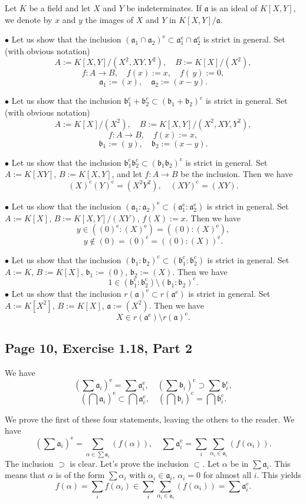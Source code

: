 \documentclass[parskip=half,fontsize=12pt]{scrartcl}%
\newcommand{\oo}{\operatorname}\newcommand{\ooo}{\operatorname*}
\newcommand{\mf}{\mathfrak}
\newcommand{\bu}{\bullet}
\begin{document}
Let $K$ be a field and let $X$ and $Y$ be indeterminates. If $\mf a$ is an ideal of $K[X,Y]$, we denote by $x$ and $y$ the images of $X$ and $Y$ in $K[X,Y]/\mf a$.

$\bu$ Let us show that the inclusion $(\mf a_1\cap\mf a_2)^{\oo e}\subset\mf a_1^{\oo e}\cap\mf a_2^{\oo e}$ is strict in general. Set (with obvious notation) 
$$
A:=K[X,Y]/(X^2,XY,Y^2),\quad B:=K[X]/(X^2),
$$ 
$$
f:A\to B,\quad f(x):=x,\quad f(\,y):=0,
$$ 
$$
\mf a_1:=(x),\quad\mf a_2:=(x-y).
$$

$\bu$ Let us show that the inclusion $\mf b_1^{\oo c}+\mf b_2^{\oo c}\subset(\mf b_1+\mf b_2)^{\oo c}$ is strict in general. Set (with obvious notation) 
$$
A:=K[X]/(X^2),\quad B:=K[X,Y]/(X^2,XY,Y^2),
$$ 
$$
f:A\to B,\quad f(x):=x,
$$ 
$$
\mf b_1:=(\,y),\quad\mf b_2:=(x-y).
$$

$\bu$ Let us show that the inclusion $\mf b_1^{\oo c}\mf b_2^{\oo c}\subset(\mf b_1\mf b_2)^{\oo c}$ is strict in general. Set $A:=K[XY]$, $B:=K[X,Y]$, and let $f:A\to B$ be the inclusion. Then we have 
$$
(X)^{\oo c}(Y)^{\oo c}=(X^2Y^2),\quad(XY)^{\oo c}=(XY).
$$

$\bu$ Let us show that the inclusion $(\mf a_1:\mf a_2)^{\oo e}\subset(\mf a_1^{\oo e}:\mf a_2^{\oo e})$ is strict in general. Set $A:=K[X]$, $B:=K[X,Y]/(XY)$, $f(X):=x$. Then we have 
$$
y\in((0)^{\oo e}:(X)^{\oo e})=((0):(X)^{\oo e}),
$$ 
$$y\notin(0)=(0)^{\oo e}=((0):(X))^{\oo e}.$$

$\bu$ Let us show that the inclusion $(\mf b_1:\mf b_2)^{\oo c}\subset(\mf b_1^{\oo c}:\mf b_2^{\oo c})$ is strict in general. Set $A:=K$, $B:=K[X]$, $\mf b_1:=(0)$, $\mf b_2:=(X)$. Then we have 
$$
1\in(\mf b_1^{\oo c}:\mf b_2^{\oo c})\setminus(\mf b_1:\mf b_2)^{\oo c}.
$$
$\bu$ Let us show that the inclusion $r(\mf a)^{\oo e}\subset r(\mf a^{\oo e})$ is strict in general. Set $A:=K[X^2]$, $B:=K[X]$, $\mf a:=(X^2)$. Then we have 
$$
X\in r(\mf a^{\oo e})\setminus r(\mf a)^{\oo e}.
$$

\subsection{Page 10, Exercise 1.18, Part 2}%

We have 
$$
\left(\sum\mf a_i\right)^{\oo e}=\sum\mf a_i^{\oo e},\quad\left(\sum\mf b_i\right)^{\oo c}\supset\sum\mf b_i^{\oo c},
$$
$$
\left(\bigcap\mf a_i\right)^{\oo e}\subset\bigcap\mf a_i^{\oo e},\quad\left(\bigcap\mf b_i\right)^{\oo c}=\bigcap\mf b_i^{\oo c}.
$$

We prove the first of these four statements, leaving the others to the reader. We have 
$$
\left(\sum\mf a_i\right)^{\oo e}=\sum_{\alpha\in\sum\mf a_i}(f(\alpha)),\quad\sum\mf a_i^{\oo e}=\sum_i\sum_{\alpha_i\in\mf a_i}(f(\alpha_i)).
$$ 
The inclusion $\supset$ is clear. Let's prove the inclusion $\subset$. Let $\alpha$ be in $\sum\mf a_i$. This means that $\alpha$ is of the form $\sum\alpha_i$ with $\alpha_i\in\mf a_i$, $\alpha_i=0$ for almost all $i$. This yields 
$$
f(\alpha)=\sum_if(\alpha_i)\in\sum_i\sum_{\alpha_i\in\mf a_i}(f(\alpha_i))=\sum\mf a_i^{\oo e}.
$$ 
\end{document}
